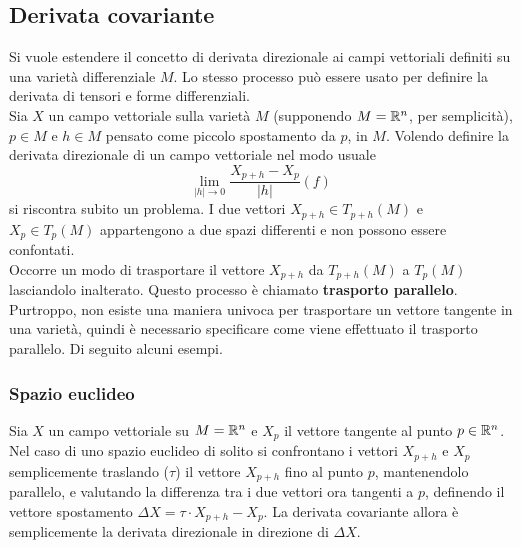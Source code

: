 %

\subsection{Derivata covariante}\label{sec:covariantderivative}
Si vuole estendere il concetto di derivata direzionale ai campi vettoriali definiti
su una varietà differenziale $M$. Lo stesso processo può essere usato per definire
la derivata di tensori e forme differenziali.\\

Sia $X$ un campo vettoriale sulla varietà $M$ (supponendo $M = \mathbb{R}^n$,
per semplicità), $p \in M$ e $h \in M$ pensato come piccolo spostamento da $p$, in $M$.
Volendo definire la derivata direzionale di un campo vettoriale nel modo usuale
$$
   \lim_{|h| \to 0} \frac{X_{p+h}-X_p}{|h|}(f)
$$
si riscontra subito un problema. I due vettori $X_{p+h} \in T_{p+h}(M)$ e
$X_p \in T_p(M)$ appartengono a due spazi differenti e non possono essere confontati.\\
Occorre un modo di trasportare il vettore $X_{p+h}$ da $T_{p+h}(M)$ a $T_p(M)$
lasciandolo inalterato. Questo processo è chiamato \textbf{trasporto parallelo}.
Purtroppo, non esiste una maniera univoca per trasportare un vettore tangente in
una varietà, quindi è necessario specificare come viene effettuato il trasporto
parallelo. Di seguito alcuni esempi.

\subsubsection{Spazio euclideo}
Sia $X$ un campo vettoriale su $M = \mathbb{R}^n$ e $X_p$ il vettore tangente al punto $p \in \mathbb{R} ^n$.
Nel caso di uno spazio euclideo di solito si confrontano i vettori
$X_{p+h}$ e $X_p$ semplicemente traslando ($\tau$) il vettore $X_{p+h}$ fino al punto $p$,
mantenendolo parallelo, e valutando la differenza tra i due vettori ora tangenti
a $p$, definendo il vettore spostamento $\Delta X = \tau \cdot X_{p+h} - X_p$.
La derivata covariante allora è semplicemente la derivata direzionale in
direzione di $\Delta X$.

